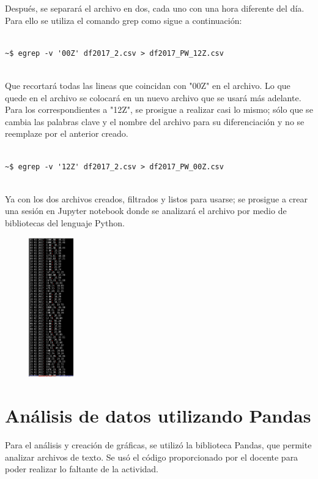 \documentclass{article}
\begin{document}
Después, se separará el archivo en dos, cada uno con una hora diferente del día. Para ello se utiliza el comando grep como sigue a continuación:

\begin{verbatim}

~$ egrep -v '00Z' df2017_2.csv > df2017_PW_12Z.csv


\end{verbatim}

Que recortará todas las lineas que coincidan con "00Z" en el archivo. Lo que quede en el archivo se colocará en un nuevo archivo que se usará más adelante.
Para los correspondientes a "12Z", se prosigue a realizar casi lo mismo; sólo que se cambia las palabras clave y el nombre del archivo para su diferenciación y no se reemplaze por el anterior creado.

\begin{verbatim}

~$ egrep -v '12Z' df2017_2.csv > df2017_PW_00Z.csv


\end{verbatim}

Ya con los dos archivos creados, filtrados y listos para usarse; se prosigue a crear una sesión en Jupyter notebook donde se analizará el archivo por medio de bibliotecas del lenguaje Python.

\begin{center}

\includegraphics[width=4cm, height=6cm]{final.png}

\end{center}


\section{Análisis de datos utilizando Pandas}

Para el análisis y creación de gráficas, se utilizó la biblioteca Pandas, que permite analizar archivos de texto. Se usó el código proporcionado por el docente para poder realizar lo faltante de la actividad.
\end{document}
